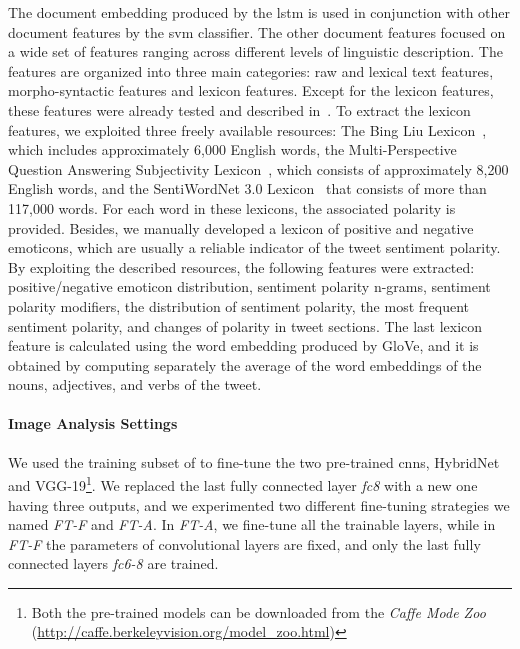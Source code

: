 The document embedding produced by the \gls{lstm} is used in conjunction with other document features by the \gls{svm} classifier.
The other document features focused on a wide set of features ranging across different levels of linguistic description.
The features are organized into three main categories: raw and lexical text features, morpho-syntactic features and lexicon features.
Except for the lexicon features, these features were already tested and described in~\cite{cimino2016tandem}.
To extract the lexicon features, we exploited three freely available resources: The Bing Liu Lexicon~\cite{hu2004mining}, which includes approximately 6,000 English words, the Multi-Perspective Question Answering Subjectivity Lexicon~\cite{wilson2005recognizing}, which consists of approximately 8,200 English words, and the SentiWordNet 3.0 Lexicon~\cite{baccianella2010sentiwordnet} that consists of more than 117,000 words.
For each word in these lexicons, the associated polarity is provided.
Besides, we manually developed a lexicon of positive and negative emoticons, which are usually a reliable indicator of the tweet sentiment polarity.
By exploiting the described resources, the following features were extracted: positive/negative emoticon distribution, sentiment polarity n-grams, sentiment polarity modifiers, the distribution of sentiment polarity, the most frequent sentiment polarity, and changes of polarity in tweet sections.
The last lexicon feature is calculated using the word embedding produced by GloVe, and it is obtained by computing separately the average of the word embeddings of the nouns, adjectives, and verbs of the tweet.

\paragraph{Image Analysis Settings}
We used the training subset of \BTSA{} to fine-tune the two pre-trained \glspl{cnn}, HybridNet and VGG-19\footnote{Both the pre-trained models can be downloaded from the \emph{Caffe Mode Zoo} (\url{http://caffe.berkeleyvision.org/model_zoo.html})}.
We replaced the last fully connected layer \emph{fc8} with a new one having three outputs, and we experimented two different fine-tuning strategies we named \emph{FT-F} and \emph{FT-A}.
In \emph{FT-A}, we fine-tune all the trainable layers, while in \emph{FT-F} the parameters of convolutional layers are fixed, and only the last fully connected layers \emph{fc6-8} are trained.

